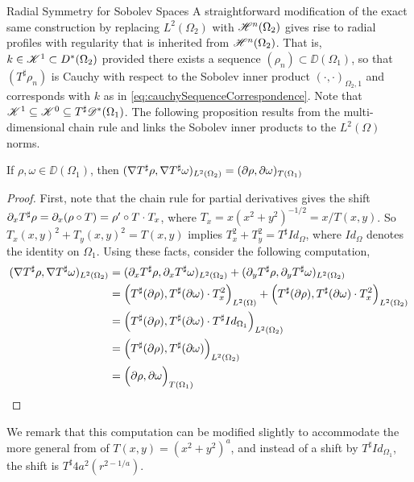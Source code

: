 \begin{chapter}{Radial Symmetry for Sobolev Spaces}
A straightforward modification of the exact same construction by replacing $L^2(\Omega_2)$ with $\mathscr H^n(\Omega_2)$ gives rise to radial profiles with regularity that is inherited from $\mathscr H^n(\Omega_2)$.
That is, $k \in\mathscr K^1 \subset D^*(\Omega_2)$ provided there exists a sequence $(\rho_n) \subset \DD(\Omega_1)$, so that $(T^\sharp \rho_n)$ is Cauchy with respect to the Sobolev inner product $( \cdot, \cdot )_{\Omega_2,1}$ and corresponds with $k$ as in \eqref{eq:cauchySequenceCorrespondence}.
Note that $\mathscr K^1 \subseteq \mathscr K^0 \subseteq T^\sharp\mathscr D^*(\Omega_1)$.
The following proposition results from the multi-dimensional chain rule and links the Sobolev inner products to the $L^2(\Omega)$ norms.
\begin{prop} \label{prop:gradChainRule}
  If $\rho,\omega \in \DD(\Omega_1)$, then $(\nabla T^\sharp \rho, \nabla T^\sharp \omega)_{L^2(\Omega_2)} = (\partial \rho,\partial \omega)_{T(\Omega_1)}$
\end{prop}
\begin{proof}
First, note that the chain rule for partial derivatives gives the shift $\partial_x T^\sharp \rho = \partial_x (\rho\circ T) = \rho'\circ T \cdot T_x$, where $T_x = x(x^2 + y^2)^{-1/2} = x/T(x,y)$.
So $T_x(x,y)^2 + T_y(x,y)^2 = T(x,y)$ implies $T_x^2 + T_y^2 = T^\sharp Id_{\Omega}$, where $Id_{\Omega}$ denotes the identity on $\Omega_1$.
Using these facts, consider the following computation,
\begin{align}
  (\nabla T^\sharp \rho, \nabla T^\sharp \omega)_{L^2(\Omega_2)} 
  &= (\partial_x T^\sharp \rho, \partial_x T^\sharp \omega)_{L^2(\Omega_2)} + (\partial_y T^\sharp \rho, \partial_y T^\sharp \omega)_{L^2(\Omega_2)} \nonumber\\
  &= \Big(T^\sharp(\partial\rho), T^\sharp( \partial\omega)  \cdot T_x^2\Big)_{L^2(\Omega)} + \Big(T^\sharp(\partial\rho), T^\sharp( \partial\omega)  \cdot T_x^2\Big)_{L^2(\Omega_2)} \nonumber\\
  &= \Big(T^\sharp(\partial\rho), T^\sharp( \partial\omega)  \cdot T^\sharp Id_{\Omega_1}\Big)_{L^2(\Omega_2)} \nonumber\\
  &= \Big(T^\sharp(\partial\rho), T^\sharp( \partial\omega) \Big)_{L^2(\Omega_2)} \nonumber\\
  &= \Big(\partial\rho, \partial\omega \Big)_{T(\Omega_1)} \nonumber\\
\end{align}
\end{proof}
We remark that this computation can be modified slightly to accommodate the more general from of $T(x,y) = (x^2+y^2)^a$, and instead of a shift by $T^\sharp Id_{\Omega_1}$, the shift is $T^\sharp 4a^2(r^{2-1/a})$. 


\end{chapter}
